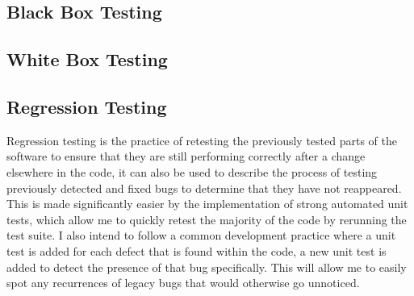 \subsection{Black Box Testing}

\subsection{White Box Testing}


\subsection{Regression Testing}
Regression testing is the practice of retesting the previously tested parts of the software to ensure that they are still performing correctly after a change elsewhere in the code, it can also be used to describe the process of testing previously detected and fixed bugs to determine that they have not reappeared.
This is made significantly easier by the implementation of strong automated unit tests, which allow me to quickly retest the majority of the code by rerunning the test suite.
I also intend to follow a common development practice where a unit test is added for each defect that is found within the code, a new unit test is added to detect the presence of that bug specifically. 
This will allow me to easily spot any recurrences of legacy bugs that would otherwise go unnoticed.

